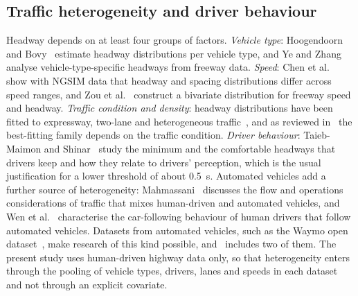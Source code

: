 \documentclass[11pt,a4paper]{article}
\numberwithin{equation}{section}
\begin{document}
\subsection{Traffic heterogeneity and driver behaviour}
Headway depends on at least four groups of factors. \emph{Vehicle type}: Hoogendoorn and Bovy~\cite{hoogendoorn1998} estimate headway distributions per vehicle type, and Ye and Zhang~\cite{ye2009} analyse vehicle-type-specific headways from
freeway data. \emph{Speed}: Chen et al.~\cite{chen2010} show with NGSIM data that headway and spacing distributions differ across speed ranges, and Zou et al.~\cite{zou2014} construct a bivariate distribution for freeway speed and headway.
\emph{Traffic condition and density}: headway distributions have been fitted to expressway, two-lane and heterogeneous traffic~\cite{panichpapiboon2015,roysaha2017,maurya2016}, and as reviewed in~\cite{leungbootnak} the best-fitting family depends on the traffic condition.
\emph{Driver behaviour}: Taieb-Maimon and Shinar~\cite{taieb2001} study the minimum and the comfortable headways that drivers keep and how they relate to drivers' perception, which is the usual justification for a lower threshold of about 0.5~s.
Automated vehicles add a further source of heterogeneity: Mahmassani~\cite{mahmassani2016} discusses the flow and operations considerations of traffic that mixes human-driven and automated vehicles, and Wen et al.~\cite{wen2022}
characterise the car-following behaviour of human drivers that follow automated vehicles. Datasets from automated vehicles, such as the Waymo open dataset~\cite{hu2022}, make research of this kind possible, and~\cite{leungbootnak} includes two of them.
The present study uses human-driven highway data only, so that heterogeneity enters through the pooling of vehicle types, drivers, lanes and speeds in each dataset and not through an explicit covariate.
\end{document}
